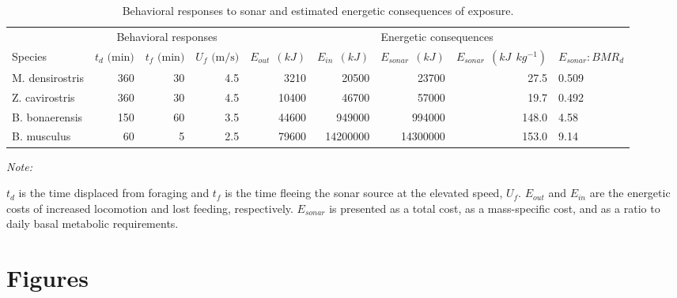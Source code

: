 \documentclass[]{elsarticle} %
\begin{document}
\begin{landscape}\begin{table}[t]

\caption{\label{tab:esonar_tbl}Behavioral responses to sonar and estimated energetic consequences of exposure. \label{esonar_tbl}}
\centering
\begin{threeparttable}
\begin{tabular}{lrrrrrrrl}
\toprule
\multicolumn{1}{c}{} & \multicolumn{3}{c}{Behavioral responses} & \multicolumn{5}{c}{Energetic consequences} \\
\cmidrule(l{3pt}r{3pt}){2-4} \cmidrule(l{3pt}r{3pt}){5-9}
Species & $t_d \text{ (min)}$ & $t_f \text{ (min)}$ & $U_f \text{ (m/s)}$ & $E_{out} ~~ (kJ)$ & $E_{in} ~~ (kJ)$ & $E_{sonar} ~~ (kJ)$ & $E_{sonar} ~~ (kJ ~~ kg^{-1})$ & $E_{sonar}:BMR_d$\\
\midrule
M. densirostris & 360 & 30 & 4.5 & 3210 & 20500 & 23700 & 27.5 & 0.509\\
Z. cavirostris & 360 & 30 & 4.5 & 10400 & 46700 & 57000 & 19.7 & 0.492\\
B. bonaerensis & 150 & 60 & 3.5 & 44600 & 949000 & 994000 & 148.0 & 4.58\\
B. musculus & 60 & 5 & 2.5 & 79600 & 14200000 & 14300000 & 153.0 & 9.14\\
\bottomrule
\end{tabular}
\begin{tablenotes}
\item \textit{Note: } 
\item $t_d$ is the time displaced from foraging and $t_f$ is the time fleeing the sonar source at the elevated speed, $U_f$. $E_{out}$ and $E_{in}$ are the energetic costs of increased locomotion and lost feeding, respectively. $E_{sonar}$ is presented as a total cost, as a mass-specific cost, and as a ratio to daily basal metabolic requirements.
\end{tablenotes}
\end{threeparttable}
\end{table}
\end{landscape}

\section{Figures}\label{figures}
\end{document}
